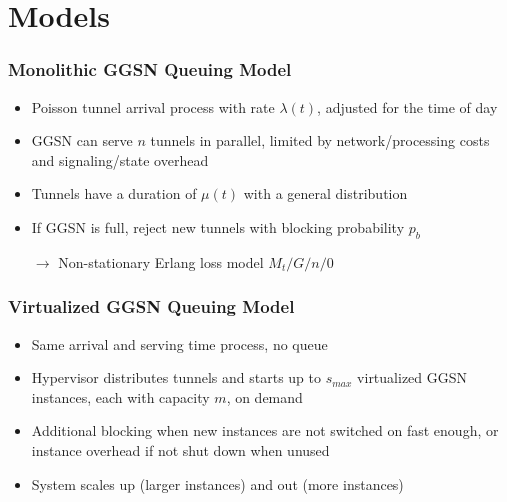 \documentclass{beamer}
\begin{document}
\section{Models}


\begin{frame}
	\frametitle{Monolithic GGSN Queuing Model}
		\begin{center}
		\resizebox{!}{2.8cm}{%
			
		}
		\end{center}

		\begin{itemize}
			\item Poisson tunnel arrival process with rate $\lambda(t)$, adjusted for the time of day
			\item GGSN can serve $n$ tunnels in parallel, limited by network/processing costs and signaling/state overhead
			\item Tunnels have a duration of $\mu(t)$ with a general distribution
			\item If GGSN is full, reject new tunnels with blocking probability $p_b$
			\item[$\rightarrow$] Non-stationary Erlang loss model $M_t/G/n/0$ 
		\end{itemize}

\end{frame}

\begin{frame}
	\frametitle{Virtualized GGSN Queuing Model}
		\begin{center}
		\resizebox{!}{3.8cm}{%
			
		}
		\end{center}

		\begin{itemize}
			\item Same arrival and serving time process, no queue
			\item Hypervisor distributes tunnels and starts up to $s_{max}$ virtualized GGSN instances, each with capacity $m$, on demand
			\item Additional blocking when new instances are not switched on fast enough, or instance overhead if not shut down when unused
			\item System scales up (larger instances) and out (more instances)
		\end{itemize}
\end{frame}
\end{document}
